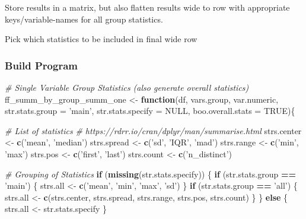 \documentclass[
]{book}
\newenvironment{Shaded}{\begin{snugshade}}{\end{snugshade}}
\newcommand{\CommentTok}[1]{\textcolor[rgb]{0.56,0.35,0.01}{\textit{#1}}}
\newcommand{\ControlFlowTok}[1]{\textcolor[rgb]{0.13,0.29,0.53}{\textbf{#1}}}
\newcommand{\DataTypeTok}[1]{\textcolor[rgb]{0.13,0.29,0.53}{#1}}
\newcommand{\KeywordTok}[1]{\textcolor[rgb]{0.13,0.29,0.53}{\textbf{#1}}}
\newcommand{\NormalTok}[1]{#1}
\newcommand{\OperatorTok}[1]{\textcolor[rgb]{0.81,0.36,0.00}{\textbf{#1}}}
\newcommand{\OtherTok}[1]{\textcolor[rgb]{0.56,0.35,0.01}{#1}}
\newcommand{\StringTok}[1]{\textcolor[rgb]{0.31,0.60,0.02}{#1}}
\begin{document}
Store results in a matrix, but also flatten results wide to row with appropriate keys/variable-names for all group statistics.

Pick which statistics to be included in final wide row

\hypertarget{build-program}{%
\subsubsection{Build Program}\label{build-program}}

\begin{Shaded}
\begin{Highlighting}[]
\CommentTok{# Single Variable Group Statistics (also generate overall statistics)}
\NormalTok{ff_summ_by_group_summ_one <-}\StringTok{ }\ControlFlowTok{function}\NormalTok{(df, vars.group, var.numeric, }\DataTypeTok{str.stats.group =} \StringTok{'main'}\NormalTok{,}
                                      \DataTypeTok{str.stats.specify =} \OtherTok{NULL}\NormalTok{, }\DataTypeTok{boo.overall.stats =} \OtherTok{TRUE}\NormalTok{)\{}

    \CommentTok{# List of statistics}
    \CommentTok{# https://rdrr.io/cran/dplyr/man/summarise.html}
\NormalTok{    strs.center <-}\StringTok{ }\KeywordTok{c}\NormalTok{(}\StringTok{'mean'}\NormalTok{, }\StringTok{'median'}\NormalTok{)}
\NormalTok{    strs.spread <-}\StringTok{ }\KeywordTok{c}\NormalTok{(}\StringTok{'sd'}\NormalTok{, }\StringTok{'IQR'}\NormalTok{, }\StringTok{'mad'}\NormalTok{)}
\NormalTok{    strs.range <-}\StringTok{ }\KeywordTok{c}\NormalTok{(}\StringTok{'min'}\NormalTok{, }\StringTok{'max'}\NormalTok{)}
\NormalTok{    strs.pos <-}\StringTok{ }\KeywordTok{c}\NormalTok{(}\StringTok{'first'}\NormalTok{, }\StringTok{'last'}\NormalTok{)}
\NormalTok{    strs.count <-}\StringTok{ }\KeywordTok{c}\NormalTok{(}\StringTok{'n_distinct'}\NormalTok{)}

    \CommentTok{# Grouping of Statistics}
    \ControlFlowTok{if}\NormalTok{ (}\KeywordTok{missing}\NormalTok{(str.stats.specify)) \{}
        \ControlFlowTok{if}\NormalTok{ (str.stats.group }\OperatorTok{==}\StringTok{ 'main'}\NormalTok{) \{}
\NormalTok{            strs.all <-}\StringTok{ }\KeywordTok{c}\NormalTok{(}\StringTok{'mean'}\NormalTok{, }\StringTok{'min'}\NormalTok{, }\StringTok{'max'}\NormalTok{, }\StringTok{'sd'}\NormalTok{)}
\NormalTok{        \}}
        \ControlFlowTok{if}\NormalTok{ (str.stats.group }\OperatorTok{==}\StringTok{ 'all'}\NormalTok{) \{}
\NormalTok{            strs.all <-}\StringTok{ }\KeywordTok{c}\NormalTok{(strs.center, strs.spread, strs.range, strs.pos, strs.count)}
\NormalTok{        \}}
\NormalTok{    \} }\ControlFlowTok{else}\NormalTok{ \{}
\NormalTok{        strs.all <-}\StringTok{ }\NormalTok{str.stats.specify}
\NormalTok{    \}}


\end{Highlighting}
\end{Shaded}
\end{document}

